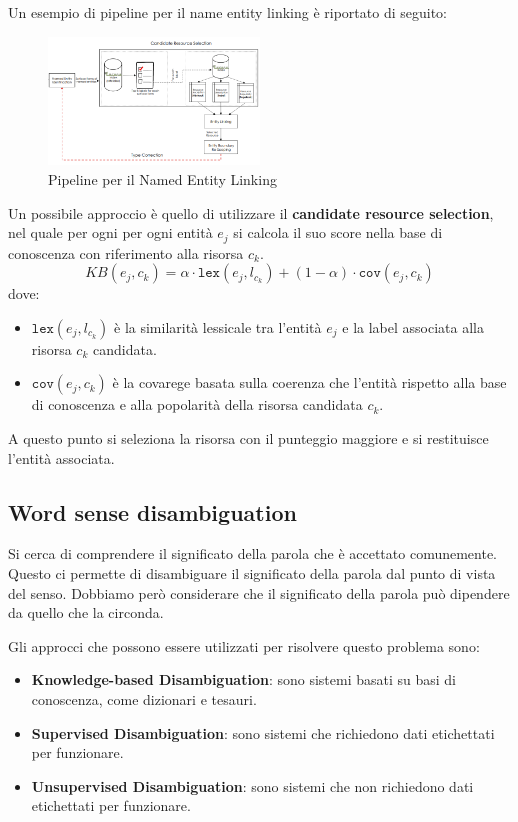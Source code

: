 Un esempio di pipeline per il name entity linking è riportato di seguito:
\begin{figure}[!ht]
      \centering
      \includegraphics[width=0.5\textwidth]{./img/nlp/nel.png}
      \caption{Pipeline per il Named Entity Linking}
      \label{fig:nel}
\end{figure}
Un possibile approccio è quello di utilizzare il \textbf{candidate resource selection},
nel quale per ogni per ogni entità $e_j$ si calcola il suo score nella base di conoscenza
con riferimento alla risorsa $c_k$.
\begin{equation}
      KB(e_j, c_k) = \alpha \cdot \texttt{lex}(e_j, l_{c_k}) + (1 - \alpha) \cdot \texttt{cov}(e_j, c_k)
\end{equation}
dove:
\begin{itemize}
      \item $\texttt{lex}(e_j, l_{c_k})$ è la similarità lessicale tra l'entità
            $e_j$ e la label associata alla risorsa $c_k$ candidata.
      \item $\texttt{cov}(e_j, c_k)$ è la covarege basata sulla coerenza che l'entità
            rispetto alla base di conoscenza e alla popolarità della risorsa candidata $c_k$.
\end{itemize}
A questo punto si seleziona la risorsa con il punteggio maggiore e si restituisce
l'entità associata.
\subsection{Word sense disambiguation}
Si cerca di comprendere il significato della parola che è accettato comunemente.
Questo ci permette di disambiguare il significato della parola dal punto di
vista del senso. Dobbiamo però considerare che il significato della parola può
dipendere da quello che la circonda.

Gli approcci che possono essere utilizzati per risolvere questo problema sono:
\begin{itemize}
      \item \textbf{Knowledge-based Disambiguation}: sono sistemi basati su basi
            di conoscenza, come dizionari e tesauri.
      \item \textbf{Supervised Disambiguation}: sono sistemi che richiedono dati
            etichettati per funzionare.
      \item \textbf{Unsupervised Disambiguation}: sono sistemi che non richiedono
            dati etichettati per funzionare.
\end{itemize}

